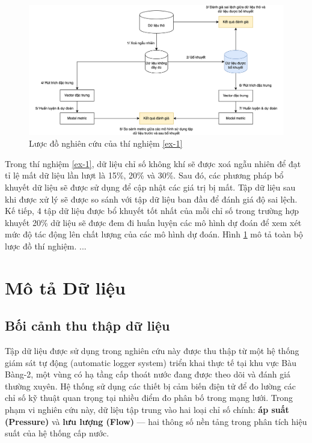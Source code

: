 \begin{figure}[h]
    \centering
    \includegraphics[width=\linewidth]{image/section6_1/experiment.drawio.png}
    \caption{Lược đồ nghiên cứu của thí nghiệm \ref{ex-1}}
    \label{fig:section6_1-experiment}
\end{figure}
Trong thí nghiệm \ref{ex-1}, dữ liệu chỉ số không khí sẽ được xoá ngẫu nhiên để đạt tỉ lệ mất dữ liệu lần lượt là 15\%, 20\% và 30\%. Sau đó, các phương pháp bổ khuyết dữ liệu sẽ được sử dụng để cập nhật các giá trị bị mất. Tập dữ liệu sau khi được xử lý sẽ được so sánh với tập dữ liệu ban đầu để đánh giá độ sai lệch. Kế tiếp, 4 tập dữ liệu được bổ khuyết tốt nhất của mỗi chỉ số trong trường hợp khuyết 20\% dữ liệu sẽ được đem đi huấn luyện các mô hình dự đoán để xem xét mức độ tác động lên chất lượng của các mô hình dự đoán. Hình \ref{fig:section6_1-experiment} mô tả toàn bộ lược đồ thí nghiệm.
...

\section{Mô tả Dữ liệu}

\subsection{Bối cảnh thu thập dữ liệu}

Tập dữ liệu được sử dụng trong nghiên cứu này được thu thập từ một hệ thống giám sát tự động (automatic logger system) triển khai thực tế tại khu vực Bàu Bàng-2, một vùng có hạ tầng cấp thoát nước đang được theo dõi và đánh giá thường xuyên. Hệ thống sử dụng các thiết bị cảm biến điện tử để đo lường các chỉ số kỹ thuật quan trọng tại nhiều điểm đo phân bố trong mạng lưới. Trong phạm vi nghiên cứu này, dữ liệu tập trung vào hai loại chỉ số chính: \textbf{áp suất (Pressure)} và \textbf{lưu lượng (Flow)} — hai thông số nền tảng trong phân tích hiệu suất của hệ thống cấp nước.

